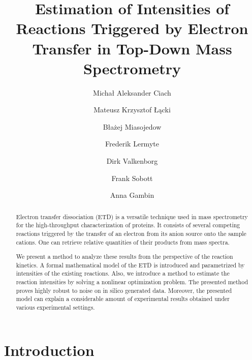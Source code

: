 \documentclass{llncs}
\begin{document}
\pagestyle{plain}
\title{Estimation of Intensities of Reactions Triggered by Electron Transfer in Top-Down Mass Spectrometry}
\author{Michał Aleksander Ciach \and Mateusz Krzysztof Łącki \and Błażej Miasojedow \and Frederik Lermyte \and Dirk Valkenborg \and Frank Sobott \and Anna Gambin }



\maketitle
\begin{abstract}
Electron transfer dissociation (ETD) is a versatile technique used in mass spectrometry for the high-throughput characterization of proteins. It consists of several competing reactions triggered by the transfer of an electron from its anion source onto the sample cations. One can retrieve relative quantities of their products from mass spectra.

We present a method to analyze these results from the perspective of the reaction kinetics. A formal mathematical model of the ETD is introduced and parametrized by intensities of the existing reactions. Also, we introduce a method to estimate the reaction intensities by solving a nonlinear optimization problem. The presented method proves highly robust to noise on in silico generated data. Moreover, the presented model can explain a considerable amount of experimental results obtained under various experimental settings.
\end{abstract}

\section{Introduction}
\end{document}
